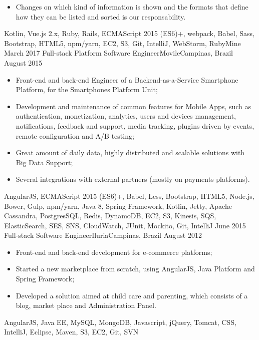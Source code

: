 \begin{experiences}
{\begin{itemize}
      \item Changes on which kind of information is shown and the formats that define how they can be listed and sorted is our responsability.
    \end{itemize}
  }
  {Kotlin, Vue.js 2.x, Ruby, Rails, ECMAScript 2015 (ES6)+, webpack, Babel, Sass, Bootstrap, HTML5, npm/yarn, EC2, S3, Git, IntelliJ, WebStorm, RubyMine}
  \emptySeparator
  \experience
    {March 2017}   {Full-stack Platform Software Engineer}{Movile}{Campinas, Brazil}
    {August 2015} {
    \begin{itemize}
      \item Front-end and back-end Engineer of a Backend-as-a-Service Smartphone Platform,
      for the Smartphones Platform Unit;
      \item Development and maintenance of common features for Mobile Apps, such as authentication,
      monetization, analytics, users and devices management, notifications, feedback and support,
      media tracking, plugins driven by events, remote configuration and A/B testing;
      \item Great amount of daily data, highly distributed and scalable solutions with Big Data Support;
      \item Several integrations with external partners (mostly on payments platforms).\\
    \end{itemize}
  }
  {AngularJS, ECMAScript 2015 (ES6)+, Babel, Less, Bootstrap, HTML5, Node.js, Bower, Gulp, npm/yarn, Java 8, Spring Framework, Kotlin, Jetty, Apache Cassandra, PostgresSQL, Redis, DynamoDB, EC2, S3, Kinesis, SQS, ElasticSearch, SES, SNS, CloudWatch, JUnit, Mockito, Git, IntelliJ}
  \emptySeparator
  \experience
    {June 2015} {Full-stack Software Engineer}{Iluria}{Campinas, Brazil}
    {August 2012}    {
      \begin{itemize}
        \item Front-end and back-end development for e-commerce platforms;
        \item Started a new marketplace from scratch, using AngularJS, Java Platform and Spring Framework;
        \item Developed a solution aimed at child care and parenting, which consists of a blog, market place and Administration Panel.\\
      \end{itemize}
    }{AngularJS, Java EE, MySQL, MongoDB, Javascript, jQuery, Tomcat, CSS, IntelliJ, Eclipse, Maven, S3, EC2, Git, SVN}
  \emptySeparator

\end{experiences}
